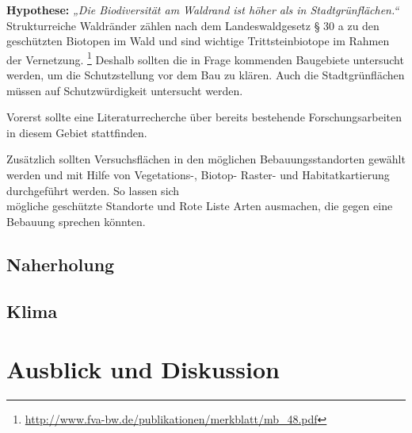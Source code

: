 \documentclass[12pt]{article}
\newcommand{\citefooturl}[1]{\footnote{\url{#1}}}
\begin{document}
\textbf{Hypothese:} \textit{„Die Biodiversität am Waldrand ist höher als in Stadtgrünflächen.“} \\

Strukturreiche Waldränder zählen nach dem Landeswaldgesetz § 30 a zu den geschützten Biotopen 
im Wald und sind wichtige Trittsteinbiotope im Rahmen der Vernetzung. \citefooturl{http://www.fva-bw.de/publikationen/merkblatt/mb_48.pdf} 
Deshalb sollten die in Frage kommenden Baugebiete untersucht werden, um die Schutzstellung vor dem Bau zu klären. 
Auch die Stadtgrünflächen müssen auf Schutzwürdigkeit untersucht werden. 

Vorerst sollte eine Literaturrecherche über bereits bestehende Forschungsarbeiten in diesem Gebiet stattfinden. 

Zusätzlich sollten Versuchsflächen in den möglichen Bebauungsstandorten gewählt werden und  mit Hilfe von 
Vegetations-, Biotop- Raster- und Habitatkartierung durchgeführt werden. So lassen sich \\ mögliche geschützte 
Standorte und Rote Liste Arten ausmachen, die gegen eine Bebauung sprechen könnten. 

\subsection{Naherholung}
\subsection{Klima}

\section{Ausblick und Diskussion}
\end{document}
